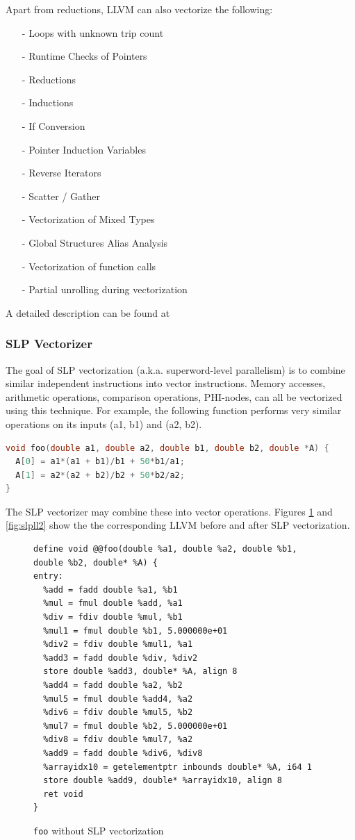 \documentclass[a4paper,bibliography=totocnumbered,parskip,headsepline]{scrbook}
\begin{document}
Apart from reductions, LLVM can also vectorize the following:
\begin{itemize}[noitemsep]
 \item[-] Loops with unknown trip count
 \item[-] Runtime Checks of Pointers
 \item[-] Reductions
 \item[-] Inductions
 \item[-] If Conversion
 \item[-] Pointer Induction Variables
 \item[-] Reverse Iterators
 \item[-] Scatter / Gather
 \item[-] Vectorization of Mixed Types
 \item[-] Global Structures Alias Analysis
 \item[-] Vectorization of function calls
 \item[-] Partial unrolling during vectorization
\end{itemize}
A detailed description can be found at 

\subsubsection{SLP Vectorizer}
The goal of SLP vectorization (a.k.a. superword-level parallelism) is to combine similar independent instructions into vector instructions.
Memory accesses, arithmetic operations, comparison operations, PHI-nodes, can all be vectorized using this technique.
For example, the following function performs very similar operations on its inputs (a1, b1) and (a2, b2).

\begin{lstlisting}[language=C]
void foo(double a1, double a2, double b1, double b2, double *A) {
  A[0] = a1*(a1 + b1)/b1 + 50*b1/a1;
  A[1] = a2*(a2 + b2)/b2 + 50*b2/a2;
}
\end{lstlisting}

The SLP vectorizer may combine these into vector operations.
Figures \ref{fig:slpll1} and \ref{fig:slpll2} show the the corresponding LLVM before and after SLP vectorization.

\begin{figure}
\begin{lstlisting}
define void @@foo(double %a1, double %a2, double %b1, double %b2, double* %A) {
entry:
  %add = fadd double %a1, %b1
  %mul = fmul double %add, %a1
  %div = fdiv double %mul, %b1
  %mul1 = fmul double %b1, 5.000000e+01
  %div2 = fdiv double %mul1, %a1
  %add3 = fadd double %div, %div2
  store double %add3, double* %A, align 8
  %add4 = fadd double %a2, %b2
  %mul5 = fmul double %add4, %a2
  %div6 = fdiv double %mul5, %b2
  %mul7 = fmul double %b2, 5.000000e+01
  %div8 = fdiv double %mul7, %a2
  %add9 = fadd double %div6, %div8
  %arrayidx10 = getelementptr inbounds double* %A, i64 1
  store double %add9, double* %arrayidx10, align 8
  ret void
}
\end{lstlisting}
\caption{\lstinline{foo} without SLP vectorization}
\label{fig:slpll1}
\end{figure}
\end{document}
